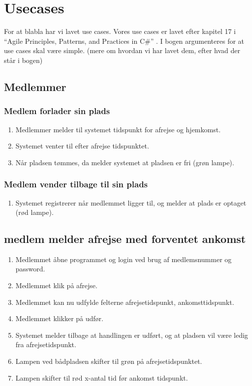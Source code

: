 \section{Usecases}
For at blabla har vi lavet use cases. Vores use cases er lavet efter kapitel 17 i “Agile Principles, Patterns, and Practices in C\#” \cite{martin2006agile}. I bogen argumenteres for at use cases skal være simple. (mere om hvordan vi har lavet dem, efter hvad der står i bogen)

\subsection{Medlemmer}

    \subsubsection{Medlem forlader sin plads}

    \begin{enumerate}
      \item Medlemmer melder til systemet tidspunkt for afrejse og hjemkomst.
      \item Systemet venter til efter afrejse tidspunktet.
      \item Når pladsen tømmes, da melder systemet at pladsen er fri (grøn lampe).
    \end{enumerate}

        \subsubsection{Medlem vender tilbage til sin plads}

    \begin{enumerate}
      \item Systemet registrerer når medlemmet ligger til, og melder at plads er optaget (rød lampe).
    \end{enumerate}

	\subsection{medlem melder afrejse med forventet ankomst}

	\begin{enumerate}
	\item Medlemmet åbne programmet og login ved brug af medlemsnummer og password.
	\item Medlemmet klik på afrejse.
	\item Medlemmet kan nu udfylde felterne afrejsetidspunkt, ankomsttidspunkt.
	\item Medlemmet klikker på udfør.
	\item Systemet melder tilbage at handlingen er udført, og at pladsen vil være ledig fra afrejsetidspunkt.
	\item Lampen ved bådpladsen skifter til grøn på afrejsetidspunktet.
	\item Lampen skifter til rød x-antal tid før ankomst tidspunkt.	
	\end{enumerate}

